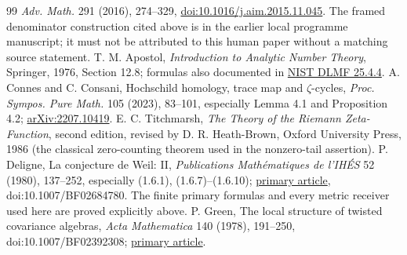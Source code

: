 \documentclass[11pt]{article}
\begin{document}
\begin{thebibliography}{99}
\emph{Adv. Math.} 291 (2016), 274--329,
\href{https://doi.org/10.1016/j.aim.2015.11.045}{doi:10.1016/j.aim.2015.11.045}.
The framed denominator construction cited above is in the earlier local
programme manuscript; it must not be attributed to this human paper
without a matching source statement.
 T. M. Apostol, \emph{Introduction to Analytic Number Theory},
Springer, 1976, Section 12.8; formulas also documented in
\href{https://dlmf.nist.gov/25.4.E4}{NIST DLMF 25.4.4}.
 A. Connes and C. Consani, Hochschild homology,
trace map and $\zeta$-cycles, \emph{Proc. Sympos. Pure Math.} 105
(2023), 83--101, especially Lemma 4.1 and Proposition 4.2;
\href{https://arxiv.org/abs/2207.10419}{arXiv:2207.10419}.
 E. C. Titchmarsh, \emph{The Theory of the Riemann
Zeta-Function}, second edition, revised by D. R. Heath-Brown,
Oxford University Press, 1986 (the classical zero-counting theorem used
in the nonzero-tail assertion).
 P. Deligne, La conjecture de Weil: II,
\emph{Publications Math\'ematiques de l'IH\'ES} 52 (1980), 137--252,
especially (1.6.1), (1.6.7)--(1.6.10);
\href{https://www.numdam.org/item/PMIHES_1980__52__137_0/}{primary article},
doi:10.1007/BF02684780. The finite primary formulas and every metric
receiver used here are proved explicitly above.
 P. Green, The local structure of twisted covariance
algebras, \emph{Acta Mathematica} 140 (1978), 191--250,
doi:10.1007/BF02392308;
\href{https://archive.ymsc.tsinghua.edu.cn/pacm_download/117/6237-11511_2006_Article_BF02392308.pdf}{primary article}.
\end{thebibliography}
\end{document}
